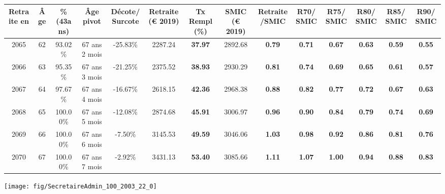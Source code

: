 \begin{adjustbox}{max width=\textwidth} 
\begin{tabular}[htb]{|c|c||c|c|c||c|c||c|c||c|c|c|c|c|} 
\hline 
 Retraite en &  Âge &  \%(43ans) &  Âge pivot &  Décote/Surcote &  Retraite (\euro{} 2019) &  Tx Rempl(\%) &  SMIC (\euro{} 2019) &  Retraite/SMIC &  R70/SMIC &  R75/SMIC &  R80/SMIC &  R85/SMIC &  R90/SMIC \\ 
\hline \hline 
 2065 &  62 &  93.02\% &  67 ans 2 mois &  -25.83\% &  2287.24 &  {\bf 37.97} &  2892.68 &  {\bf {\color{red} 0.79}} &  {\bf {\color{red} 0.71}} &  {\bf {\color{red} 0.67}} &  {\bf {\color{red} 0.63}} &  {\bf {\color{red} 0.59}} &  {\bf {\color{red} 0.55}} \\ 
\hline 
 2066 &  63 &  95.35\% &  67 ans 3 mois &  -21.25\% &  2375.52 &  {\bf 38.93} &  2930.29 &  {\bf {\color{red} 0.81}} &  {\bf {\color{red} 0.74}} &  {\bf {\color{red} 0.69}} &  {\bf {\color{red} 0.65}} &  {\bf {\color{red} 0.61}} &  {\bf {\color{red} 0.57}} \\ 
\hline 
 2067 &  64 &  97.67\% &  67 ans 4 mois &  -16.67\% &  2618.15 &  {\bf 42.36} &  2968.38 &  {\bf {\color{red} 0.88}} &  {\bf {\color{red} 0.82}} &  {\bf {\color{red} 0.77}} &  {\bf {\color{red} 0.72}} &  {\bf {\color{red} 0.67}} &  {\bf {\color{red} 0.63}} \\ 
\hline 
 2068 &  65 &  100.00\% &  67 ans 5 mois &  -12.08\% &  2874.68 &  {\bf 45.91} &  3006.97 &  {\bf {\color{red} 0.96}} &  {\bf {\color{red} 0.90}} &  {\bf {\color{red} 0.84}} &  {\bf {\color{red} 0.79}} &  {\bf {\color{red} 0.74}} &  {\bf {\color{red} 0.69}} \\ 
\hline 
 2069 &  66 &  100.00\% &  67 ans 6 mois &  -7.50\% &  3145.53 &  {\bf 49.59} &  3046.06 &  {\bf 1.03} &  {\bf {\color{red} 0.98}} &  {\bf {\color{red} 0.92}} &  {\bf {\color{red} 0.86}} &  {\bf {\color{red} 0.81}} &  {\bf {\color{red} 0.76}} \\ 
\hline 
 2070 &  67 &  100.00\% &  67 ans 7 mois &  -2.92\% &  3431.13 &  {\bf 53.40} &  3085.66 &  {\bf 1.11} &  {\bf 1.07} &  {\bf 1.00} &  {\bf {\color{red} 0.94}} &  {\bf {\color{red} 0.88}} &  {\bf {\color{red} 0.83}} \\ 
\hline 
\hline 
\end{tabular} 
\end{adjustbox} 
 
 \vspace{0.1cm} 

 {\hspace{-2.2cm}\texttt{[image: fig/SecretaireAdmin\_100\_2003\_22\_0]}} 

